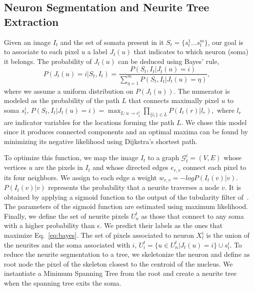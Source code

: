 \subsection{Neuron Segmentation and Neurite Tree Extraction}
\label{sec:segmentation}
\vspace{-2mm}
Given an  image $I_t$  and the set  of somata  present in it  $S_t=\{s_t^1 \dots
s_t^m \}$,  our goal is  to associate  to each pixel  $u$ a label  $J_t(u)$ that
indicates to which neuron (soma) it belongs.   The probability of $J_t(u)$ can be deduced
using Bayes' rule,
\begin{equation}
  \label{eq:bayes}
  P(J_t(u)=i|S_t,I_t) = \frac{P(S_t,I_t| J_t(u)=i)}{\sum_{\eta=1}^m P(S_t,I_t|J_t(u)=\eta)},
\end{equation}
\noindent where we assume a  uniform distribution on $P(J_t(u))$.  The numerator
is modeled as the probability of  the path $L$ that connects maximally pixel
$u$ to  soma $s_t^i$,  $ P(S_t,I_t| J_t(u)=i) =  \max_{L:u\rightarrow s_t^i}
\prod_{\{l_{r}\} \in L } P(I_t(r)|l_{r}),$ where $l_{r}$ are indicator variables
for the  locations forming the path $L$.  We chose this model  since it produces
connected  components and  an  optimal maxima  can  be found  by minimizing  its
negative likelihood using Dijkstra's shortest path.

To optimize this function, we map  the image $I_t$ to a graph $\mathcal{G}_t^i =
(V,E)$  whose vertices  $u$ are  the pixels  in $I_t$  and whose  directed edges
$e_{r,v}$ connect  each pixel to its four  neighbors.  We assign to  each edge a
weight $w_{r,v}  = -log P(I_t(v)|v)$.  $P(I_t(v)|v)$  represents the probability
that  a neurite  traverses a  node $v$.  It is  obtained by  applying  a sigmoid
function  to  the  output  of  the tubularity  filter  of~\cite{Frangi98}.   The
parameters   of    the   sigmoid   function   are    estimated   using   maximum
likelihood. Finally, we  define the set of neurite pixels  $U_n^t$ as those that
connect to any soma with a higher probability than $\epsilon$.  We predict their
labels  as  the  ones  that  maximize Eq.~\ref{eq:bayes}.   The  set  of  pixels
associated  to  neuron  $X_t^i$ is  the  union  of  the  neurites and  the  soma
associated with  $i$, $ U_i^t  = \{u \in  U_n^t | J_t(u)  = i\} \cup  s_t^i$. To
reduce the neurite segmentation to a  tree, we skeletonize the neuron and define
as  root  node  the pixel  of  the  skeleton  closest  to  the centroid  of  the
nucleus.  We instantiate  a Minimum  Spanning Tree  from the  root and  create a
neurite tree when the spanning tree exits the soma.




